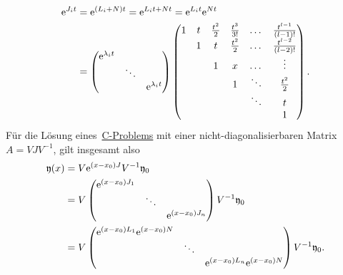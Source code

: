 \begin{align*}
    \mathrm{e}^{J_i t} &= \mathrm{e}^{(L_i + N) t} = \mathrm{e}^{L_i t + Nt} = \mathrm{e}^{L_i t} \mathrm{e}^{Nt}\\
    &= \begin{pmatrix}
           \mathrm{e}^{\lambda_i t} &        & \\
                            & \ddots & \\
                            &        & \mathrm{e}^{\lambda_i t}
        \end{pmatrix}
        \begin{pmatrix}
            1 & t & \frac{t^2}{2} & \frac{t^3}{3!} & \dots  & \frac{t^{l-1}}{(l-1)!}\\
              & 1 & t             & \frac{t^2}{2}  & \dots  & \frac{t^{l-2}}{(l-2)!}\\
              &   & 1             & x              & \dots  & \vdots\\
              &   &               & 1              & \ddots & \frac{t^2}{2}\\
              &   &               &                & \ddots & t\\
              &   &               &                &        & 1
        \end{pmatrix}.
\end{align*}
Für die Lösung eines~\hyperref[eq:cp]{C-Problems} mit einer nicht-diagonalisierbaren Matrix $A = V J V^{-1}$,
gilt insgesamt also
\begin{align*}
    \mathfrak{y}(x) &= V \mathrm{e}^{(x - x_0) J} V^{-1} \mathfrak{y}_0\\
    &= V \begin{pmatrix}
            \mathrm{e}^{(x - x_0) J_1} &        & \\
                               & \ddots & \\
                               &        & \mathrm{e}^{(x - x_0) J_n}
        \end{pmatrix} V^{-1} \mathfrak{y}_0\\
    &= V \begin{pmatrix}
            \mathrm{e}^{(x - x_0) L_1} \mathrm{e}^{(x - x_0) N} &        & \\
                                                & \ddots & \\
                                                &        & \mathrm{e}^{(x - x_0) L_n} \mathrm{e}^{(x - x_0) N}
        \end{pmatrix} V^{-1} \mathfrak{y}_0.
\end{align*}